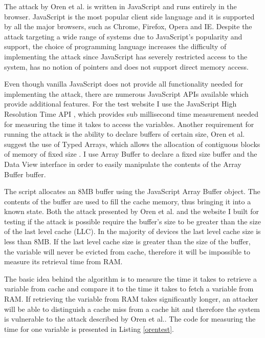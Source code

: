 \documentclass[10pt,a4paper,twoside]{book}
\begin{document}
The attack by Oren et al. is written in JavaScript and runs entirely in the browser. JavaScript is the most popular client side language and it is supported by all the major browsers, such as Chrome, Firefox, Opera and IE. Despite the attack targeting a wide range of systems due to JavaScript's popularity and support, the choice of programming language increases the difficulty of implementing the attack since JavaScript has severely restricted access to the system, has no notion of pointers and does not support direct memory access.

Even though vanilla JavaScript does not provide all functionality needed for implementing the attack, there are numerous JavaScript APIs available which provide additional features. For the test website I use the JavaScript High Resolution Time API \cite{jshighresolutiontimeapi}, which provides sub millisecond time measurement needed for measuring the time it takes to access the variables. Another requirement for running the attack is the ability to declare buffers of certain size, Oren et al. suggest the use of Typed Arrays, which allows the allocation of contiguous blocks of memory of fixed size \cite{typedarrays}. I use Array Buffer \cite{arraybuffer} to declare a fixed size buffer and the Data View \cite{dataview} interface in order to easily manipulate the contents of the Array Buffer buffer.

The script allocates an 8MB buffer using the JavaScript Array Buffer object. The contents of the buffer are used to fill the cache memory, thus bringing it into a known state. Both the attack presented by Oren et al. and the website I built for testing if the attack is possible require the buffer's size to be greater than the size of the last level cache (LLC). In the majority of devices the last level cache size is less than 8MB. If the last level cache size is greater than the size of the buffer, the variable will never be evicted from cache, therefore it will be impossible to measure its retrieval time from RAM.

The basic idea behind the algorithm is to measure the time it takes to retrieve a variable from cache and compare it to the time it takes to fetch a variable from RAM. If retrieving the variable from RAM takes significantly longer, an attacker will be able to distinguish a cache miss from a cache hit and therefore the system is vulnerable to the attack described by Oren et al.\cite{oren2015spy}. The code for measuring the time for one variable is presented in Listing \ref{orentest}.
\end{document}
